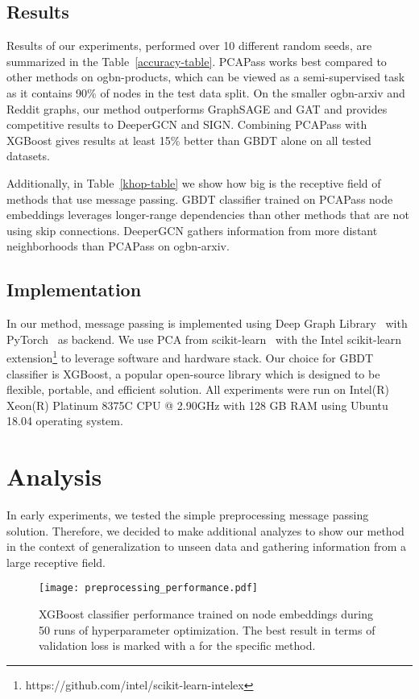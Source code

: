 \documentclass[nohyperref]{article}
\theoremstyle{plain}
\theoremstyle{definition}
\theoremstyle{remark}
\begin{document}
\subsection{Results}
Results of our experiments, performed over 10 different random seeds, are summarized in the Table~\ref{accuracy-table}.
PCAPass works best compared to other methods on ogbn-products, which can be viewed as a semi-supervised task as it contains 90\%  of nodes in the test data split. 
On the smaller ogbn-arxiv and Reddit graphs, our method outperforms GraphSAGE and GAT and provides competitive results to DeeperGCN and SIGN. 
Combining PCAPass with XGBoost gives results at least 15\% better than GBDT alone on all tested datasets.

Additionally, in Table~\ref{khop-table} we show how big is the receptive field of methods that use message passing.
GBDT classifier trained on PCAPass node embeddings leverages longer-range dependencies than other methods that are not using skip connections. DeeperGCN gathers information from more distant neighborhoods than PCAPass on ogbn-arxiv.

\subsection{Implementation}
In our method, message passing is implemented using Deep Graph Library~\cite{wang2020deep} with PyTorch~\cite{paszke2019pytorch} as backend. We use PCA from scikit-learn~\cite{pedregosa2018scikitlearn} with the Intel scikit-learn extension\footnote{https://github.com/intel/scikit-learn-intelex} to leverage software and hardware stack. Our choice for GBDT classifier is XGBoost, a popular open-source library which is designed to be flexible, portable, and efficient solution. All experiments were run on Intel(R) Xeon(R) Platinum 8375C CPU @ 2.90GHz with 128 GB RAM using Ubuntu 18.04 operating system.

\section{Analysis}
In early experiments, we tested the simple preprocessing message passing solution. 
Therefore, we decided to make additional analyzes to show our method in the context of generalization to unseen data and gathering information from a large receptive field.

\begin{figure}[H]
    \vskip 0.2in
    \begin{center}
    \centerline{\texttt{[image: preprocessing\_performance.pdf]}}
    \caption{XGBoost classifier performance trained on node embeddings during 50 runs of hyperparameter optimization. The best result in terms of validation loss is marked with a \textbf{\large } for the specific method.}
    \label{fig:pcapass_validation}
    \end{center}
    \vskip -0.2in
\end{figure}
\end{document}
